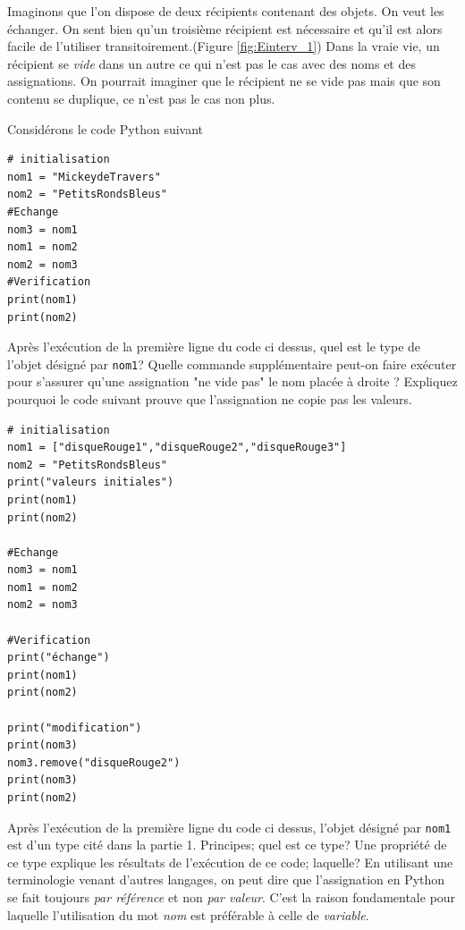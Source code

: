 Imaginons que l'on dispose de deux récipients contenant des objets. On veut les échanger. On sent bien qu'un troisième récipient est nécessaire et qu'il est alors facile de l'utiliser transitoirement.(Figure \ref{fig:Einterv_1})\newline
Dans la vraie vie, un récipient se \emph{vide} dans un autre ce qui n'est pas le cas avec des noms et des assignations. On pourrait imaginer que le récipient ne se vide pas mais que son contenu se duplique, ce n'est pas le cas non plus.

Considérons le code Python suivant
\begin{verbatim}
# initialisation
nom1 = "MickeydeTravers"
nom2 = "PetitsRondsBleus"
#Echange
nom3 = nom1
nom1 = nom2
nom2 = nom3
#Verification
print(nom1)
print(nom2)
\end{verbatim}
Après l'exécution de la première ligne du code ci dessus, quel est le type de l'objet désigné par \texttt{nom1}?
Quelle commande supplémentaire peut-on faire exécuter pour s'assurer qu'une assignation "ne vide pas" le nom placée à droite ?
Expliquez pourquoi le code suivant prouve que l'assignation ne copie pas les valeurs.
\begin{verbatim}
# initialisation
nom1 = ["disqueRouge1","disqueRouge2","disqueRouge3"]
nom2 = "PetitsRondsBleus"
print("valeurs initiales")
print(nom1)
print(nom2)

#Echange
nom3 = nom1
nom1 = nom2
nom2 = nom3

#Verification
print("échange")
print(nom1)
print(nom2)

print("modification")
print(nom3)
nom3.remove("disqueRouge2")
print(nom3)
print(nom2)
\end{verbatim}
Après l'exécution de la première ligne du code ci dessus, l'objet désigné par \texttt{nom1} est d'un type cité dans la partie 1. Principes; quel est ce type? Une propriété de ce type explique les résultats de l'exécution de ce code; laquelle? \newline
En utilisant une terminologie venant d'autres langages, on peut dire que l'assignation en Python se fait toujours \emph{par référence} et non \emph{par valeur}. C'est la raison fondamentale pour laquelle l'utilisation du mot \emph{nom} est préférable à celle de \emph{variable}.
